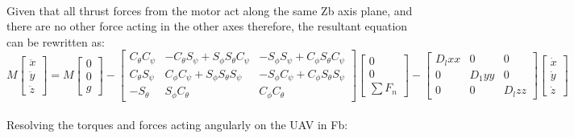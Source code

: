 \documentclass[12pt,a4paper,twoside]{report}
\begin{document}
					\\
					Given that all thrust forces from the motor act along the same Zb axis plane, and there are no other force acting in the other axes therefore, the resultant equation can be rewritten as:
					\\
					$$ 
					M 
					\begin{bmatrix}
						\ddot{x} \\
						\ddot{y} \\
						\ddot{z}
					\end{bmatrix}
					=
					M 
					\begin{bmatrix}
						0 \\
						0 \\
						g
					\end{bmatrix}
					-
					\begin{bmatrix}
						C_\theta C_\psi & -C_\theta S_\psi + S_\phi S_\theta C_\psi & -S_\phi S_\psi + C_\phi S_\theta C_\psi \\
						C_\theta S_\psi &  C_\phi C_\psi + S_\phi S_\theta S_\psi   & -S_\phi C_\psi + C_\phi S_\theta S_\psi \\
						-S_\theta       &  S_\phi C_\theta                          &  C_\phi C_\theta
					\end{bmatrix}
					\begin{bmatrix}
						0 \\
						0 \\
						\sum F_n 
					\end{bmatrix}
					-
					\begin{bmatrix}
						D_lxx & 0 & 0 \\
						0 & D_1yy & 0 \\
						0 & 0 & D_lzz
					\end{bmatrix}
					\begin{bmatrix}
						\dot{x} \\
						\dot{y} \\
						\dot{z} 
					\end{bmatrix}
					$$ 
					\\
					Resolving the torques and forces acting angularly on the UAV in Fb:
					\\
\end{document}
